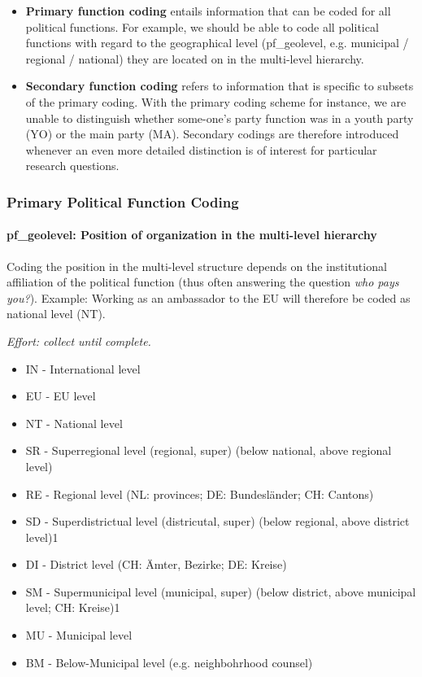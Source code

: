 \documentclass{article}
\begin{document}
        \begin{itemize}
            \item \textbf{Primary function coding} entails information that can be coded for all political functions. For example, we should be able to code all political functions with regard to the geographical level (pf\_geolevel, e.g. municipal / regional / national) they are located on in the multi-level hierarchy.
            \item \textbf{Secondary function coding} refers to information that is specific to subsets of the primary coding. With the primary coding scheme for instance, we are unable to distinguish whether some-one’s party function was in a youth party (YO) or the main party (MA). Secondary codings are therefore introduced whenever an even more detailed distinction is of interest for particular research questions.
        \end{itemize}
    
    \subsubsection{Primary Political Function Coding}
    \paragraph{pf\_geolevel: Position of organization in the multi-level hierarchy}\label{level1}
    
    Coding the position in the multi-level structure depends on the institutional affiliation of the political function (thus often answering the question \textit{who pays you?}). Example: Working as an ambassador to the EU will therefore be coded as national level (NT).\par
        \par\textit{Effort: collect until complete.}
    
    \begin{itemize}
        \item IN    - International level
        \item EU    - EU level
        \item NT    - National level
        \item SR    - Superregional level (regional, super) (below national, above regional level) 
        \item RE    - Regional level (NL: provinces; DE: Bundesländer; CH: Cantons)
        \item SD    - Superdistrictual level (districutal, super) (below regional, above district level)1
        \item DI    - District level (CH: Ämter, Bezirke; DE: Kreise)
        \item SM    - Supermunicipal level (municipal, super) (below district, above municipal level; CH: Kreise)1
        \item MU    - Municipal level
        \item BM    - Below-Municipal level (e.g. neighbohrhood counsel)

    \end{itemize}
    
\end{document}
